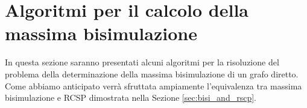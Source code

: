 \section{Algoritmi per il calcolo della massima bisimulazione}
\label{sec:algs}
In questa sezione saranno presentati alcuni algoritmi per la risoluzione del problema della determinazione della massima bisimulazione di un grafo diretto. Come abbiamo anticipato verrà sfruttata ampiamente l'equivalenza tra massima bisimulazione e RCSP dimostrata nella Sezione \ref{sec:bisi_and_rscp}.





